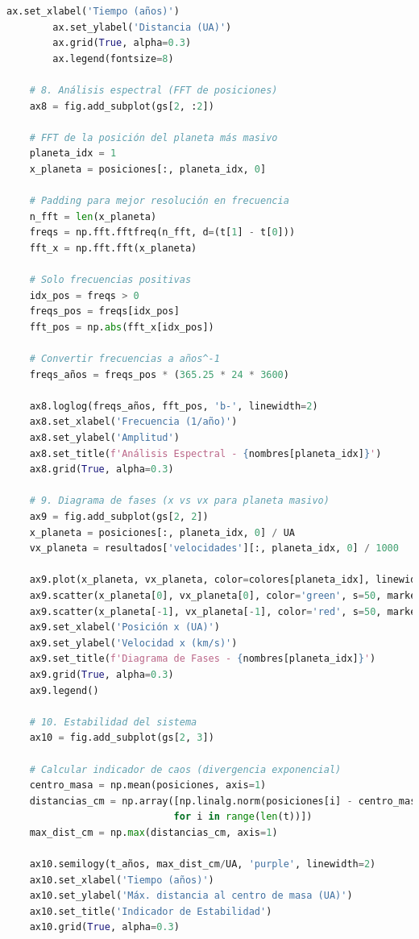 \documentclass{article}
\begin{document}
\begin{lstlisting}[language=Python, caption={Sistema completo de 4 cuerpos con análisis dinámico}]
        ax.set_xlabel('Tiempo (años)')
        ax.set_ylabel('Distancia (UA)')
        ax.grid(True, alpha=0.3)
        ax.legend(fontsize=8)
    
    # 8. Análisis espectral (FFT de posiciones)
    ax8 = fig.add_subplot(gs[2, :2])
    
    # FFT de la posición del planeta más masivo
    planeta_idx = 1
    x_planeta = posiciones[:, planeta_idx, 0]
    
    # Padding para mejor resolución en frecuencia
    n_fft = len(x_planeta)
    freqs = np.fft.fftfreq(n_fft, d=(t[1] - t[0]))
    fft_x = np.fft.fft(x_planeta)
    
    # Solo frecuencias positivas
    idx_pos = freqs > 0
    freqs_pos = freqs[idx_pos]
    fft_pos = np.abs(fft_x[idx_pos])
    
    # Convertir frecuencias a años^-1
    freqs_años = freqs_pos * (365.25 * 24 * 3600)
    
    ax8.loglog(freqs_años, fft_pos, 'b-', linewidth=2)
    ax8.set_xlabel('Frecuencia (1/año)')
    ax8.set_ylabel('Amplitud')
    ax8.set_title(f'Análisis Espectral - {nombres[planeta_idx]}')
    ax8.grid(True, alpha=0.3)
    
    # 9. Diagrama de fases (x vs vx para planeta masivo)
    ax9 = fig.add_subplot(gs[2, 2])
    x_planeta = posiciones[:, planeta_idx, 0] / UA
    vx_planeta = resultados['velocidades'][:, planeta_idx, 0] / 1000
    
    ax9.plot(x_planeta, vx_planeta, color=colores[planeta_idx], linewidth=1, alpha=0.7)
    ax9.scatter(x_planeta[0], vx_planeta[0], color='green', s=50, marker='o', label='Inicio')
    ax9.scatter(x_planeta[-1], vx_planeta[-1], color='red', s=50, marker='s', label='Final')
    ax9.set_xlabel('Posición x (UA)')
    ax9.set_ylabel('Velocidad x (km/s)')
    ax9.set_title(f'Diagrama de Fases - {nombres[planeta_idx]}')
    ax9.grid(True, alpha=0.3)
    ax9.legend()
    
    # 10. Estabilidad del sistema
    ax10 = fig.add_subplot(gs[2, 3])
    
    # Calcular indicador de caos (divergencia exponencial)
    centro_masa = np.mean(posiciones, axis=1)
    distancias_cm = np.array([np.linalg.norm(posiciones[i] - centro_masa[i], axis=1) 
                             for i in range(len(t))])
    max_dist_cm = np.max(distancias_cm, axis=1)
    
    ax10.semilogy(t_años, max_dist_cm/UA, 'purple', linewidth=2)
    ax10.set_xlabel('Tiempo (años)')
    ax10.set_ylabel('Máx. distancia al centro de masa (UA)')
    ax10.set_title('Indicador de Estabilidad')
    ax10.grid(True, alpha=0.3)
    

\end{lstlisting}
\end{document}
